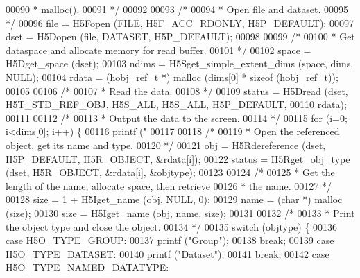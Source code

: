\begin{DoxyCode}
00090 \textcolor{comment}{     * malloc().}
00091 \textcolor{comment}{     */}
00092 
00093     \textcolor{comment}{/*}
00094 \textcolor{comment}{     * Open file and dataset.}
00095 \textcolor{comment}{     */}
00096     file = H5Fopen (FILE, H5F\_ACC\_RDONLY, H5P\_DEFAULT);
00097     dset = H5Dopen (file, DATASET, H5P\_DEFAULT);
00098 
00099     \textcolor{comment}{/*}
00100 \textcolor{comment}{     * Get dataspace and allocate memory for read buffer.}
00101 \textcolor{comment}{     */}
00102     space = H5Dget\_space (dset);
00103     ndims = H5Sget\_simple\_extent\_dims (space, dims, NULL);
00104     rdata = (hobj\_ref\_t *) malloc (dims[0] * \textcolor{keyword}{sizeof} (hobj\_ref\_t));
00105 
00106     \textcolor{comment}{/*}
00107 \textcolor{comment}{     * Read the data.}
00108 \textcolor{comment}{     */}
00109     status = H5Dread (dset, H5T\_STD\_REF\_OBJ, H5S\_ALL, H5S\_ALL, H5P\_DEFAULT,
00110                 rdata);
00111 
00112     \textcolor{comment}{/*}
00113 \textcolor{comment}{     * Output the data to the screen.}
00114 \textcolor{comment}{     */}
00115     \textcolor{keywordflow}{for} (i=0; i<dims[0]; i++) \{
00116         printf (\textcolor{stringliteral}{"%
00117 
00118         \textcolor{comment}{/*}
00119 \textcolor{comment}{         * Open the referenced object, get its name and type.}
00120 \textcolor{comment}{         */}
00121         obj = H5Rdereference (dset, H5P\_DEFAULT, H5R\_OBJECT, &rdata[i]);
00122         status = H5Rget\_obj\_type (dset, H5R\_OBJECT, &rdata[i], &objtype);
00123 
00124         \textcolor{comment}{/*}
00125 \textcolor{comment}{         * Get the length of the name, allocate space, then retrieve}
00126 \textcolor{comment}{         * the name.}
00127 \textcolor{comment}{         */}
00128         size = 1 + H5Iget\_name (obj, NULL, 0);
00129         name = (\textcolor{keywordtype}{char} *) malloc (size);
00130         size = H5Iget\_name (obj, name, size);
00131 
00132         \textcolor{comment}{/*}
00133 \textcolor{comment}{         * Print the object type and close the object.}
00134 \textcolor{comment}{         */}
00135         \textcolor{keywordflow}{switch} (objtype) \{
00136             \textcolor{keywordflow}{case} H5O\_TYPE\_GROUP:
00137                 printf (\textcolor{stringliteral}{"Group"});
00138                 \textcolor{keywordflow}{break};
00139             \textcolor{keywordflow}{case} H5O\_TYPE\_DATASET:
00140                 printf (\textcolor{stringliteral}{"Dataset"});
00141                 \textcolor{keywordflow}{break};
00142             \textcolor{keywordflow}{case} H5O\_TYPE\_NAMED\_DATATYPE:
}
\end{DoxyCode}
